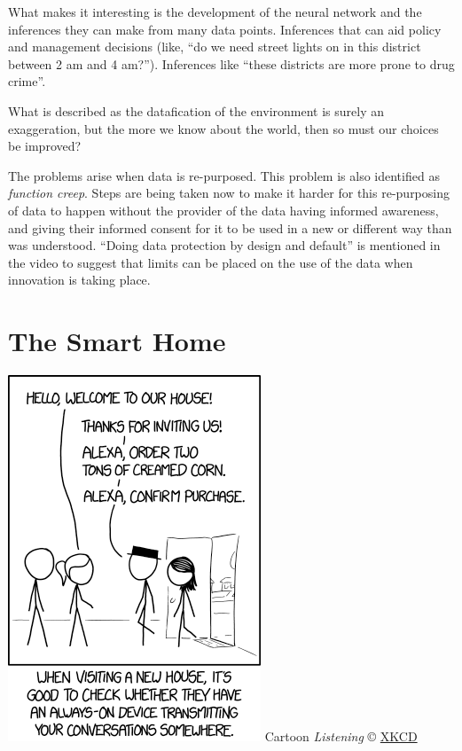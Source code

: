 \documentclass[
]{book}
\begin{document}
What makes it interesting is the development of the neural network and the inferences they can make from many data points. Inferences that can aid policy and management decisions (like, ``do we need street lights on in this district between 2 am and 4 am?''). Inferences like ``these districts are more prone to drug crime''.

What is described as the datafication of the environment is surely an exaggeration, but the more we know about the world, then so must our choices be improved?

The problems arise when data is re-purposed. This problem is also identified as \emph{function creep}. Steps are being taken now to make it harder for this re-purposing of data to happen without the provider of the data having informed awareness, and giving their informed consent for it to be used in a new or different way than was understood. ``Doing data protection by design and default'' is mentioned in the video to suggest that limits can be placed on the use of the data when innovation is taking place.

\hypertarget{the-smart-home}{%
\section{The Smart Home}\label{the-smart-home}}

\includegraphics{images/listening.png}
Cartoon \emph{Listening} © \href{https://xkcd.com/1807/\%20\%5BCC\%20BY-NC\%202.5\%5D(https://creativecommons.org/licenses/by-nc/2.5/)}{XKCD}
\end{document}
